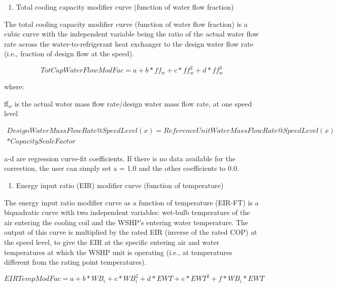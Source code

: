\begin{enumerate}
\def\labelenumi{\arabic{enumi})}
\setcounter{enumi}{2}
\item Total cooling capacity modifier curve (function of water flow fraction)
\end{enumerate}

The total cooling capacity modifier curve (function of water flow fraction) is a cubic curve with the independent variable being the ratio of the actual water flow rate across the water-to-refrigerant heat exchanger to the design water flow rate (i.e., fraction of design flow at the speed).

\begin{equation}
TotCapWaterFlowModFac = a + b*f{f_w} + c*ff_w^2 + d*ff_w^3
\end{equation}

where:

ff\(_{w}\) is the actual water mass flow rate/design water mass flow rate, at one speed level

\begin{equation}
\begin{split}
  DesignWaterMassFlowRate@SpeedLevel(x) = ReferenceUnitWaterMassFlowRate@SpeedLevel(x) \\
  * CapacityScaleFactor
\end{split}
\end{equation}

a-d are regression curve-fit coefficients.  If there is no data available for the correction, the user can simply set a = 1.0 and the other coefficients to 0.0.

\begin{enumerate}
\def\labelenumi{\arabic{enumi})}
\setcounter{enumi}{3}
\tightlist
\item
  Energy input ratio (EIR) modifier curve (function of temperature)
\end{enumerate}

The energy input ratio modifier curve as a function of temperature (EIR-FT) is a biquadratic curve with two independent variables: wet-bulb temperature of the air entering the cooling coil and the WSHP's entering water temperature. The output of this curve is multiplied by the rated EIR (inverse of the rated COP) at the speed level, to give the EIR at the specific entering air and water temperatures at which the WSHP unit is operating (i.e., at temperatures different from the rating point temperatures).

\begin{equation}
EIRTempModFac = a + b*W{B_i} + c*WB_i^2 + d*EWT + e*EW{T^2} + f*W{B_i}*EWT
\end{equation}

